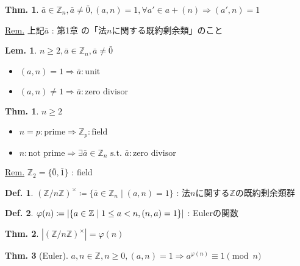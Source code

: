 \documentclass[uplatex,dvipdfmx,9pt]{beamer}
\newcommand{\st}{\text{ s.t. }}
\newcommand{\lt}{\ensuremath <}
\newcommand{\Z}{\mathbb{Z}}
\newcounter{textThmCount}
\newcounter{textLemCount}
\theoremstyle{definition} %
\newtheorem{defn}{Def.}[subsection] %
\newtheorem{thm}{Thm.}[subsection] %
\newtheorem{thmText}[textThmCount]{Thm.}
\newtheorem{lemText}[textLemCount]{Lem.} %
\theoremstyle{example}
\begin{document}
\begin{frame}

  \begin{thm}
    $\bar{a} \in \Z_n, \bar{a} \neq \bar{0}, (a, n) = 1, \forall a' \in a + (n) \Rightarrow (a', n) = 1$
  \end{thm}
  \underline{Rem.} 上記$\bar{a}$ : 第1章  の「法$n$に関する既約剰余類」のこと

  \begin{lemText}
    $n \ge 2, \bar{a} \in \Z_n, \bar{a} \neq \bar{0}$
    \begin{itemize}
      \item $(a, n) = 1 \Rightarrow \bar{a} : \text{unit}$
      \item $(a, n) \neq 1 \Rightarrow \bar{a} : \text{zero divisor}$
    \end{itemize}
  \end{lemText}

  \begin{thmText}
    $n \ge 2$
    \begin{itemize}
      \item $n = p : \text{prime} \Rightarrow \Z_p : \text{field}$
      \item $n : \text{not prime} \Rightarrow \exists \bar{a} \in \Z_n \st \bar{a} : \text{zero divisor}$
    \end{itemize}
  \end{thmText}
  \underline{Rem.} $\Z_2 = \{\bar{0}, \bar{1}\}$ : field

\end{frame}

\begin{frame}

  \begin{defn}
    $(\Z / n\Z)^\times \coloneqq \{\bar{a} \in \Z_n \mid (a, n) = 1\}$ : 法$n$に関する$\Z$の\alert{既約剰余類群}
  \end{defn}

  \begin{defn}
    $\varphi(n) \coloneqq |\{a \in \Z \mid 1 \le a \lt n, (n, a) = 1\}|$ : \alert{Eulerの関数}
  \end{defn}

  \begin{thm}
    $|(\Z / n\Z)^\times| = \varphi(n)$
  \end{thm}

  \begin{thm}[Euler]
    $a, n \in \Z, n \ge 0, (a, n) = 1 \Rightarrow a^{\varphi(n)} \equiv 1 \pmod{n}$
  \end{thm}

\end{frame}
\end{document}
